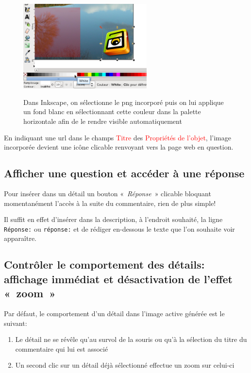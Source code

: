 \documentclass[a4paper,12pt]{report}
\newcommand{\chemin}[1]{\textcolor{red}{#1}}
\begin{document}
\begin{figure}[htp]
 \centering
 \caption{Dans Inkscape, on sélectionne le png incorporé puis on lui applique un fond blanc en sélectionnant 
 cette couleur dans la palette horizontale afin de le rendre visible automatiquement}
 \includegraphics[width=0.6\textwidth]{images/remplissage_blanc}
 \label{remplissage_blanc}
\end{figure}

En indiquant une url dans le champs \chemin{Titre} des \chemin{Propriétés de l'objet}, l'image incorporée
devient une icône clicable renvoyant vers la page web en question.

\subsection{Afficher une question et accéder à une réponse}

Pour insérer dans un détail un bouton «~\textit{Réponse}~» clicable bloquant momentanément l'accès à la suite du commentaire,
rien de plus simple!

Il suffit en effet d'insérer dans la description, à l'endroit souhaité, la ligne\\
\verb|Réponse:| ou \verb|réponse:| et de rédiger en-dessous le texte que l'on souhaite voir apparaître.

\subsection{Contrôler le comportement des détails: affichage immédiat et désactivation
de l'effet «~zoom~»}

Par défaut, le comportement d'un détail dans l'image active générée est le suivant:
\begin{enumerate}
 \item Le détail ne se révêle qu'au survol de la souris ou qu'à la sélection du titre du commentaire
 qui lui est associé
 \item Un second clic sur un détail déjà sélectionné effectue un zoom sur celui-ci
\end{enumerate}
\end{document}
